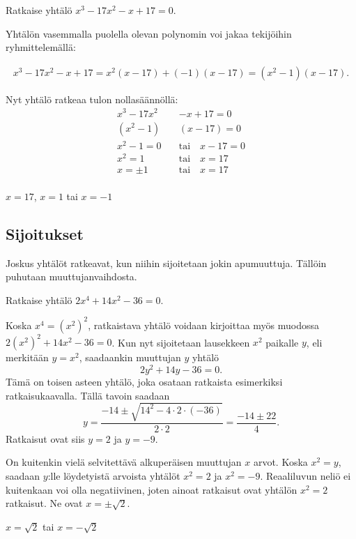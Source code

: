 \begin{esimerkki}
Ratkaise yhtälö $x^3-17x^2-x+17 = 0$.

\begin{esimratk}
Yhtälön vasemmalla puolella olevan polynomin voi jakaa tekijöihin ryhmittelemällä:

\begin{align*}
x^3-17x^2-x+17=x^2(x-17)+(-1)(x-17)=(x^2-1)(x-17).
\end{align*}

Nyt yhtälö ratkeaa tulon nollasäännöllä:
\begin{align*}
x^3-17x^2&-x+17=0 \\
(x^2-1)&(x-17)=0 \\
x^2-1 = 0 \quad &\text{tai} \quad x - 17 = 0 \\
x^2 = 1 \quad &\text{tai} \quad x = 17 \\
x =\pm 1 \quad &\text{tai} \quad x = 17 \\
\end{align*}
\end{esimratk}

\begin{esimvast}
$x = 17$, $x = 1$ tai $x=-1$
\end{esimvast}
\end{esimerkki}

\subsection*{Sijoitukset}

Joskus yhtälöt ratkeavat, kun niihin sijoitetaan jokin apumuuttuja. Tällöin puhutaan muuttujanvaihdosta.


\begin{esimerkki}
Ratkaise yhtälö $2x^4+14x^2-36=0$.

\begin{esimratk}
Koska $x^4=(x^2)^2$, ratkaistava yhtälö voidaan kirjoittaa myös muodossa $2(x^2)^2+14x^2-36=0$. Kun nyt sijoitetaan lausekkeen $x^2$ paikalle $y$, eli merkitään $y=x^2$, saadaankin muuttujan $y$ yhtälö
\[
2y^2+14y-36=0.
\]
Tämä on toisen asteen yhtälö, joka osataan ratkaista esimerkiksi ratkaisukaavalla. Tällä tavoin saadaan
\[
y=\frac{-14\pm\sqrt{14^2-4\cdot 2\cdot(-36)}}{2\cdot 2}=\frac{-14\pm 22}{4}.
\]
Ratkaisut ovat siis $y=2$ ja $y=-9$.

On kuitenkin vielä selvitettävä alkuperäisen muuttujan $x$ arvot. Koska $x^2=y$, saadaan $y$:lle löydetyistä arvoista yhtälöt $x^2=2$ ja $x^2=-9$. Reaaliluvun neliö ei kuitenkaan voi olla negatiivinen, joten ainoat ratkaisut ovat yhtälön $x^2 = 2$ ratkaisut. Ne ovat $x=\pm\sqrt{2}$.
\end{esimratk}
	\begin{esimvast}
$x=\sqrt{2}$ tai $x=-\sqrt{2}$
	\end{esimvast}
\end{esimerkki}

